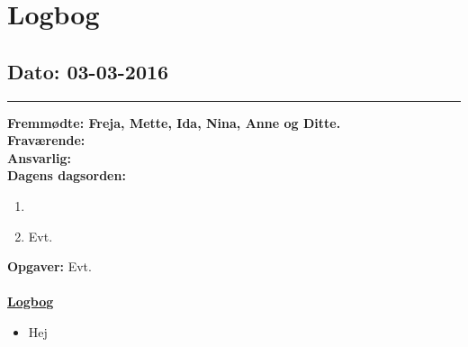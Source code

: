 \chapter{Logbog}
\section{Dato: 03-03-2016}
\hrule
\textbf{Fremmødte: Freja, Mette, Ida, Nina, Anne og Ditte.} \\
\textbf{Fraværende: } \\
\textbf{Ansvarlig: }  \\
\textbf{Dagens dagsorden: }
\begin{enumerate}
	\item 
	\item Evt. 
\end{enumerate}

\textbf{Opgaver:} \newline
Evt. \\\\
\underline{\textbf{Logbog}}
\begin{itemize}
\item Hej
\end{itemize}
